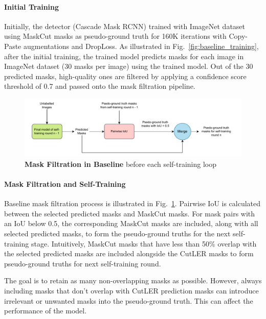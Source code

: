 \paragraph{Initial Training}
Initially, the detector (Cascade Mask RCNN) trained with  ImageNet dataset using MaskCut masks as pseudo-ground truth for 160K iterations with Copy-Paste augmentations and DropLoss. As illustrated in Fig.~\ref{fig:baseline_training}, after the initial training, the trained model predicts masks for each image in ImageNet dataset (30 masks per image) using the trained model. Out of the 30 predicted masks, high-quality ones are filtered by applying a confidence score threshold of 0.7 and passed onto the mask filtration pipeline. 

\begin{figure}
	\centering
	\includegraphics[width=1\textwidth]{Images/main/baseline_mask_filtration.pdf}
	\caption[\textbf{Mask Filtration Method in Baseline}]{\textbf{Mask Filtration in Baseline} before each self-training loop}
	\label{fig:baseline_mask_filtration}
\end{figure}


\paragraph{Mask Filtration and Self-Training}
Baseline mask filtration process is illustrated in Fig.~\ref{fig:baseline_mask_filtration}.  Pairwise IoU is calculated between the selected predicted masks and MaskCut masks. For mask pairs with an IoU below 0.5, the corresponding MaskCut masks are included, along with all selected predicted masks, to form the pseudo-ground truths for the next self-training stage. Intuitively, MaskCut masks that have less than 50\% overlap with the selected predicted masks are included alongside the CutLER masks to form pseudo-ground truths for next self-training round. 

The goal is to retain as many non-overlapping masks as possible. However, always including masks that don't overlap with CutLER prediction masks can introduce irrelevant or unwanted masks into the pseudo-ground truth. This can affect the performance of the model.

